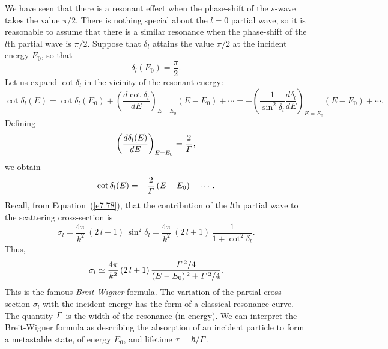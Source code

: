 We have seen that there is a resonant effect when the phase-shift of
the $s$-wave takes the value $\pi/2$.  There is nothing special about
the $l=0$ partial wave, so it is reasonable to assume that there
is a similar resonance when the phase-shift of the $l$th partial
wave is $\pi/2$. Suppose that $\delta_l$ attains the value
$\pi/2$ at the incident energy $E_0$, so that
\begin{equation}
\delta_l(E_0) = \frac{\pi}{2}.
\end{equation}
Let us expand $\cot \delta_l$ in the vicinity of the resonant energy:
\begin{equation}
\cot \delta_l(E) = \cot \delta_l(E_0) +\left(
\frac{ d \cot\delta_l}{d E}\right)_{E=E_0}(E-E_0) + \cdots=- \left(\frac{1}{\sin^2\delta_l}\frac{d\delta_l}{d E}\right)_{E=E_0}
(E-E_0)+\cdots.
\end{equation}
Defining
\begin{equation}
\left(\frac{d \delta_l(E)}{d E} \right)_{E=E_0} = \frac{2}{{\mit\Gamma}},
\end{equation}
we obtain
\begin{equation}
\cot\delta_l(E) = - \frac{2}{{\mit\Gamma}} \,(E-E_0) + \cdots.
\end{equation}
Recall, from Equation~(\ref{e7.78}), that the contribution of the $l$th partial wave
to the scattering cross-section is
\begin{equation}
\sigma_l = \frac{4\pi}{k^2} \,(2\,l+1)\,\sin^2\delta_l 
= \frac{4\pi}{k^2} \,(2\,l+1)\,\frac{1}{1+\cot^2\delta_l}.
\end{equation}
Thus,
\begin{equation}
\sigma_l \simeq \frac{4\pi}{k^2} \,(2\,l+1)\,
\frac{{\mit\Gamma}^{\,2}/4}{(E-E_0)^{\,2} + {\mit\Gamma}^{\,2}/4}.
\end{equation}
This is the famous {\em Breit-Wigner}\/ formula. The variation of
the partial cross-section $\sigma_l$ with the incident energy has
the form of a classical resonance curve. The quantity ${\mit\Gamma}$ is
the width of the resonance (in energy). We can interpret the
Breit-Wigner formula as describing the absorption of an incident particle
to form a metastable state, of energy $E_0$, and lifetime $\tau = \hbar/
{\mit\Gamma}$.

